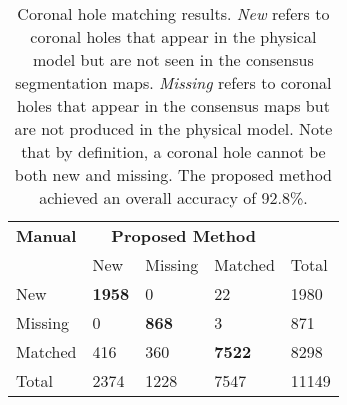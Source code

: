 \begin{table}[!b]
  \caption{Coronal hole matching results. 
  	 \textit{New} refers to coronal holes that appear in the physical model but are not seen
  	     in the consensus segmentation maps.
  	 \textit{Missing} refers to coronal holes that appear in the consensus maps
  	     but are not produced in the physical model.
  	 Note that by definition, a coronal hole cannot be both 
  	      new and missing.        
     The proposed method achieved an overall accuracy of
     92.8\%.}
  \label{tab:matchingConfusionMatrix}
  \centering
  \begin{tabular}{l l l l l }
    \toprule    
    \textbf{Manual}
    &\multicolumn{3}{c}{\textbf{Proposed Method}} & \\
    \cmidrule{2-4}
    & New & Missing & Matched & Total \\    
    \midrule
    New & \textbf{1958} & 0 & 22 & 1980\\    
    Missing & 0 & \textbf{868} & 3 & 871\\
    Matched & 416 & 360 & \textbf{7522} & 8298\\
    \midrule
    Total & 2374 & 1228 & 7547 & 11149\\
    \bottomrule
  \end{tabular}
\end{table}
